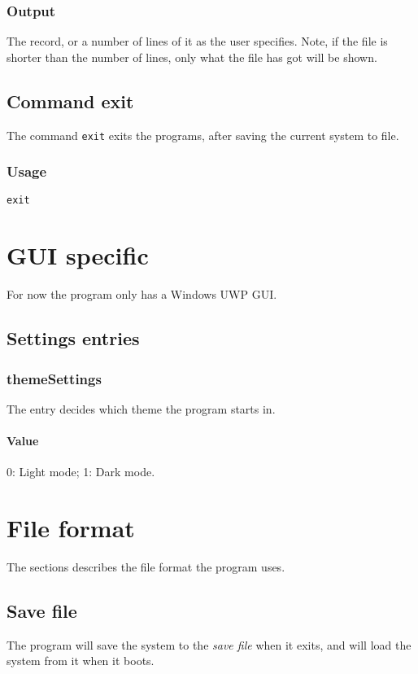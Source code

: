 \subsubsection{Output}
The record, or a number of lines of it as the user specifies. Note, if the file is shorter than the number of lines, only what the file has got will be shown.

\subsection{Command exit}
The command \texttt{exit} exits the programs, after saving the current system to file.

\subsubsection{Usage}
\begin{center}
	\texttt{exit}
\end{center}

\section{GUI specific}
For now the program only has a Windows UWP GUI.

\subsection{Settings entries}
\subsubsection{themeSettings}
The entry decides which theme the program starts in.

\paragraph{Value} 0: Light mode; 1: Dark mode.

\section{File format}
The sections describes the file format the program uses.

\subsection{Save file}
The program will save the system to the \emph{save file} when it exits, and will load the system from it when it boots.

